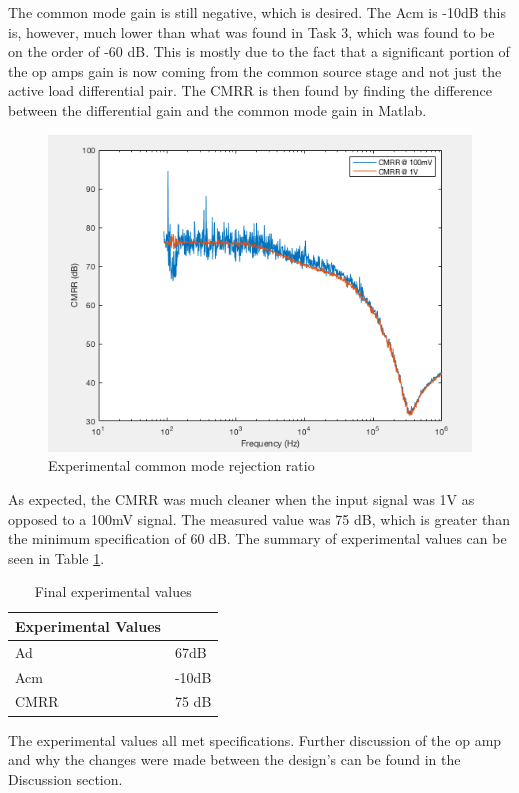 The common mode gain is still negative, which is desired. The Acm is -10dB this is, however, much lower than what was found in Task 3, which was found to be on the order of -60 dB. This is mostly due to the fact that a significant portion of the op amps gain is now coming from the common source stage and not just the active load differential pair. The CMRR is then found by finding the difference between the differential gain and the common mode gain in Matlab.


\begin{figure}[H]
	\begin{center}
		\includegraphics[scale=.40]{ExperimentalImplementation/CMRR_fin.png}
		\caption{Experimental common mode rejection ratio}
		\label{fig:cmrr}
	\end{center}
\end{figure}

 As expected, the CMRR was much cleaner when the input signal was 1V as opposed to a 100mV signal. The measured value was 75 dB, which is greater than the minimum specification of 60 dB. The summary of experimental values can be seen in Table \ref{tab:expfin}.
 
 
 \begin{table}[H]
 	\centering
 	\caption{Final experimental values}
 	\label{tab:expfin}
 	\begin{tabular}{|l|l|}
 		\hline
 		\textbf{Experimental Values} &       \\ \hline
 		Ad                           & 67dB  \\ \hline
 		Acm                          & -10dB \\ \hline
 		CMRR                         & 75 dB \\ \hline
 	\end{tabular}
 \end{table}

The experimental values all met specifications. Further discussion of the op amp and why the changes were made between the design's can be found in the Discussion section.


 



